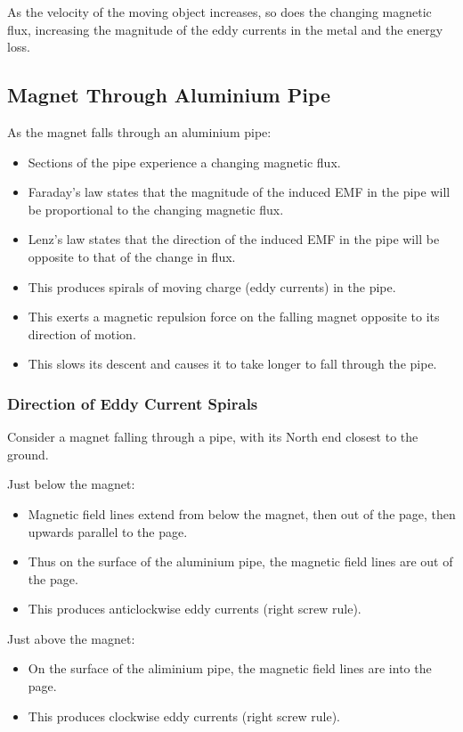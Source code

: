 \documentclass[a4paper,11pt]{article}
\begin{document}
As the velocity of the moving object increases, so does the changing magnetic
flux, increasing the magnitude of the eddy currents in the metal and the energy
loss.


\subsection{Magnet Through Aluminium Pipe}

As the magnet falls through an aluminium pipe:

\begin{itemize}
\item Sections of the pipe experience a changing magnetic flux.
\item Faraday's law states that the magnitude of the induced EMF in the pipe
	will be proportional to the changing magnetic flux.
\item Lenz's law states that the direction of the induced EMF in the pipe will
	be opposite to that of the change in flux.
\item This produces spirals of moving charge (eddy currents) in the pipe.
\item This exerts a magnetic repulsion force on the falling magnet opposite to
	its direction of motion.
\item This slows its descent and causes it to take longer to fall through the
	pipe.
\end{itemize}


\subsubsection{Direction of Eddy Current Spirals}

Consider a magnet falling through a pipe, with its North end closest to the
ground.

Just below the magnet:

\begin{itemize}
\item Magnetic field lines extend from below the magnet, then out of the page,
	then upwards parallel to the page.
\item Thus on the surface of the aluminium pipe, the magnetic field lines
	are out of the page.
\item This produces anticlockwise eddy currents (right screw rule).
\end{itemize}

Just above the magnet:

\begin{itemize}
\item On the surface of the aliminium pipe, the magnetic field lines are into
	the page.
\item This produces clockwise eddy currents (right screw rule).
\end{itemize}
\end{document}
